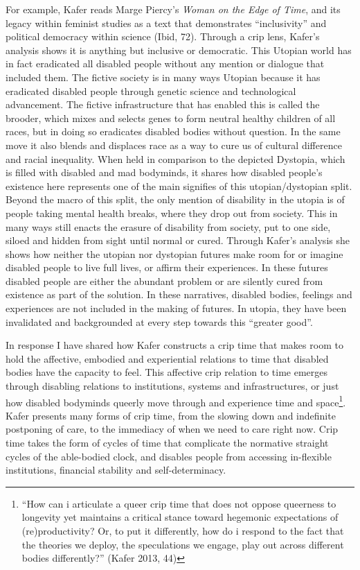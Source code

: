 For example, Kafer reads Marge Piercy's \emph{Woman on the Edge of
Time}, and its legacy within feminist studies as a text that
demonstrates ``inclusivity'' and political democracy within science
(Ibid, 72). Through a crip lens, Kafer's analysis shows it is anything
but inclusive or democratic. This Utopian world has in fact eradicated
all disabled people without any mention or dialogue that included them.
The fictive society is in many ways Utopian because it has eradicated
disabled people through genetic science and technological advancement.
The fictive infrastructure that has enabled this is called the brooder,
which mixes and selects genes to form neutral healthy children of all
races, but in doing so eradicates disabled bodies without question. In
the same move it also blends and displaces race as a way to cure us of
cultural difference and racial inequality. When held in comparison to
the depicted Dystopia, which is filled with disabled and mad bodyminds,
it shares how disabled people's existence here represents one of the
main signifies of this utopian/dystopian split. Beyond the macro of this
split, the only mention of disability in the utopia is of people taking
mental health breaks, where they drop out from society. This in many
ways still enacts the erasure of disability from society, put to one
side, siloed and hidden from sight until normal or cured. Through
Kafer's analysis she shows how neither the utopian nor dystopian futures
make room for or imagine disabled people to live full lives, or affirm
their experiences. In these futures disabled people are either the
abundant problem or are silently cured from existence as part of the
solution. In these narratives, disabled bodies, feelings and experiences
are not included in the making of futures. In utopia, they have been
invalidated and backgrounded at every step towards this ``greater
good''.

In response I have shared how Kafer constructs a crip time that makes
room to hold the affective, embodied and experiential relations to time
that disabled bodies have the capacity to feel. This affective crip
relation to time emerges through disabling relations to institutions,
systems and infrastructures, or just how disabled bodyminds queerly move
through and experience time and space\footnote{``How can i articulate a
  queer crip time that does not oppose queerness to longevity yet
  maintains a critical stance toward hegemonic expectations of
  (re)productivity? Or, to put it differently, how do i respond to the
  fact that the theories we deploy, the speculations we engage, play out
  across different bodies differently?'' (Kafer 2013, 44)}. Kafer
presents many forms of crip time, from the slowing down and indefinite
postponing of care, to the immediacy of when we need to care right now.
Crip time takes the form of cycles of time that complicate the normative
straight cycles of the able-bodied clock, and disables people from
accessing in-flexible institutions, financial stability and
self-determinacy.

